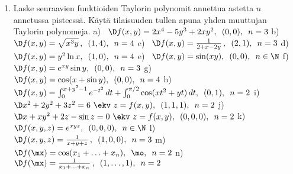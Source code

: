 \Harj
\begin{enumerate}

\item
Laske seuraavien funktioiden Taylorin polynomit annettua astetta $n$ annetussa pisteessä.
Käytä tilaisuuden tullen apuna yhden muuttujan Taylorin polynomeja.
\vspace{3mm} \newline
a) \ $\D f(x,y)=2x^4-5y^3+2xy^2,\,\ (0,0),\,\ n=3$ \vspace{3mm}\newline
b) \ $\D f(x,y)=\sqrt{x^3y}\,,\,\ (1,4),\,\ n=4$ \vspace{1.5mm}\newline
c) \ $\D f(x,y)=\frac{1}{2+x-2y}\,,\,\ (2,1),\,\ n=3$ \vspace{1.5mm}\newline
d) \ $\D f(x,y)=y^2\ln x,\,\ (1,0),\,\ n=4$ \vspace{3mm}\newline
e) \ $\D f(x,y)=\sin(xy),\,\ (0,0),\,\ n\in\N$ \vspace{3mm}\newline
f) \ $\D f(x,y)=e^{xy}\sin y,\,\ (0,0),\,\ n=3$ \vspace{3mm}\newline
g) \ $\D f(x,y)=\cos(x+\sin y),\,\ (0,0),\,\ n=4$ \vspace{1.5mm}\newline
h) \ $\D f(x,y)=\int_0^{x+y^2-1} e^{-t^2}\,dt+\int_0^{\pi/2} \cos(xt^2+yt)\,dt,\,\ 
                                             (0,1),\,\ n=2$ \vspace{1.5mm}\newline
i) \ $\D x^2+2y^2+3z^2=6\ \ekv\ z=f(x,y),\,\ (1,1,1),\,\ n=2$ \vspace{3mm}\newline
j) \ $\D x+xy^2+2z-\sin z=0\ \ekv\ z=f(x,y),\,\ (0,0,0),\,\ n=2$ \vspace{3mm}\newline
k) \ $\D f(x,y,z)=e^{xyz},\,\ (0,0,0),\,\ n\in\N$ \vspace{1.5mm}\newline
l) \ $\D f(x,y,z)=\frac{1}{x+y+z}\,,\,\ (1,0,0),\,\ n=3$ \vspace{1.5mm}\newline
m) \ $\D f(\mx)=\cos(x_1 + \ldots + x_n),\,\ \mo,\,\ n=2$ \vspace{1.5mm}\newline
n) \ $\D f(\mx)=\frac{1}{x_1 + \ldots + x_n}\,,\,\ (1,\ldots,1),\,\ n=2$


\end{enumerate}

